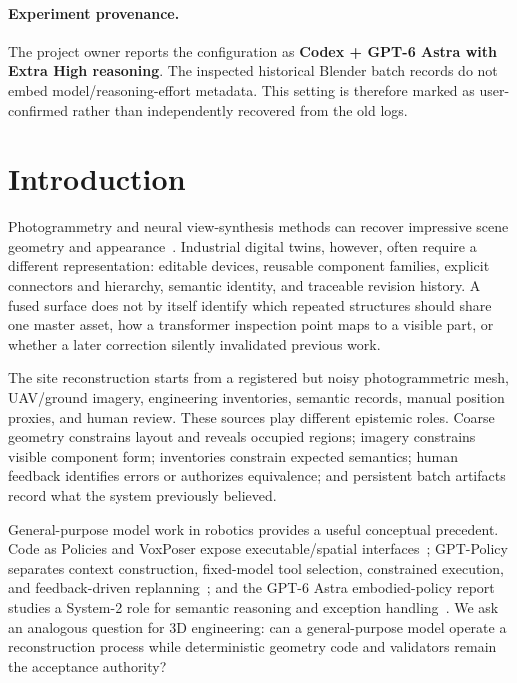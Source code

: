 \documentclass[10pt]{article}
\begin{document}
\paragraph{Experiment provenance.}
The project owner reports the configuration as \textbf{Codex + GPT-6 Astra with Extra High reasoning}. The inspected historical Blender batch records do not embed model/reasoning-effort metadata. This setting is therefore marked as user-confirmed rather than independently recovered from the old logs.

\section{Introduction}
Photogrammetry and neural view-synthesis methods can recover impressive scene geometry and appearance~\cite{schonberger2016sfm,mildenhall2020nerf,kerbl2023gaussians}. Industrial digital twins, however, often require a different representation: editable devices, reusable component families, explicit connectors and hierarchy, semantic identity, and traceable revision history. A fused surface does not by itself identify which repeated structures should share one master asset, how a transformer inspection point maps to a visible part, or whether a later correction silently invalidated previous work.

The site reconstruction starts from a registered but noisy photogrammetric mesh, UAV/ground imagery, engineering inventories, semantic records, manual position proxies, and human review. These sources play different epistemic roles. Coarse geometry constrains layout and reveals occupied regions; imagery constrains visible component form; inventories constrain expected semantics; human feedback identifies errors or authorizes equivalence; and persistent batch artifacts record what the system previously believed.

General-purpose model work in robotics provides a useful conceptual precedent. Code as Policies and VoxPoser expose executable/spatial interfaces~\cite{liang2023code,huang2023voxposer}; GPT-Policy separates context construction, fixed-model tool selection, constrained execution, and feedback-driven replanning~\cite{cheng2026gptpolicy}; and the GPT-6 Astra embodied-policy report studies a System-2 role for semantic reasoning and exception handling~\cite{su2026astraembodied}. We ask an analogous question for 3D engineering: can a general-purpose model operate a reconstruction process while deterministic geometry code and validators remain the acceptance authority?
\end{document}
